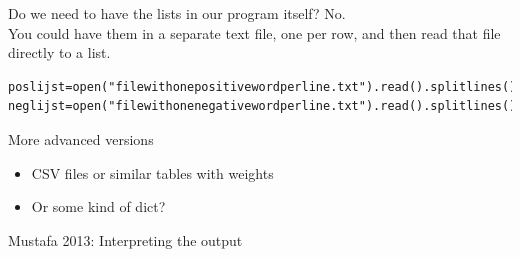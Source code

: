 \documentclass{beamer}
\begin{document}
\begin{frame}[fragile]{Do we need to have the lists in our program itself?}
No.\\
You could have them in a separate text file, one per row, and then read that file directly to a list.\\
\begin{lstlisting}
poslijst=open("filewithonepositivewordperline.txt").read().splitlines()
neglijst=open("filewithonenegativewordperline.txt").read().splitlines()
\end{lstlisting}
\end{frame}


{
\begin{frame}[plain]
\end{frame}
}


\begin{frame}{More advanced versions}
\begin{itemize}
\item CSV files or similar tables with weights
\item Or some kind of dict?
\end{itemize}
\end{frame}

{
\begin{frame}[plain]
\end{frame}
\begin{frame}[plain]
\end{frame}
}



\begin{frame}{Mustafa 2013: Interpreting the output}

\begin{columns}
\end{columns}
\end{frame}
\end{document}
